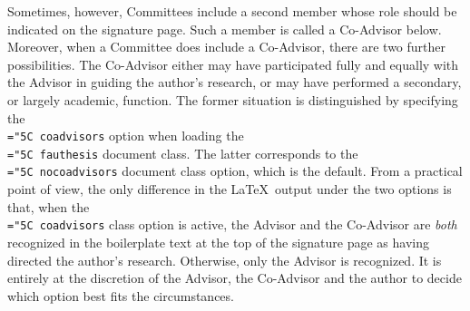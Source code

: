 \documentclass[11pt]{article}
\newcommand\code[1]{{\normalfont\texttt{\let\dv\textsl\chardef\\="5C #1}}}
\begin{document}
Sometimes, however, Committees include a second member whose role should be indicated on the signature page.  Such a member is called a Co-Advisor below.  Moreover, when a Committee does include a Co-Advisor, there are two further possibilities.  The Co-Advisor either may have participated fully and equally with the Advisor in guiding the author's research, or may have performed a secondary, or largely academic, function.  The former situation is distinguished by specifying the \code{coadvisors} option when loading the \code{fauthesis} document class.  The latter corresponds to the \code{nocoadvisors} document class option, which is the default.  From a practical point of view, the only difference in the \LaTeX\ output under the two options is that, when the \code{coadvisors} class option is active, the Advisor and the Co-Advisor are \textit{both} recognized in the boilerplate text at the top of the signature page as having directed the author's research.  Otherwise, only the Advisor is recognized.  It is entirely at the discretion of the Advisor, the Co-Advisor and the author to decide which option best fits the circumstances.
\end{document}
